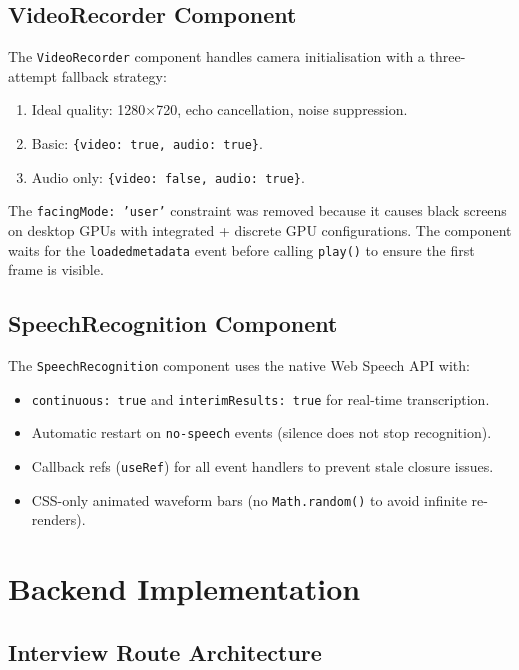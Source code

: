 \subsection{VideoRecorder Component}

The \texttt{VideoRecorder} component handles camera initialisation with a three-attempt fallback strategy:
\begin{enumerate}
    \item Ideal quality: 1280×720, echo cancellation, noise suppression.
    \item Basic: \texttt{\{video: true, audio: true\}}.
    \item Audio only: \texttt{\{video: false, audio: true\}}.
\end{enumerate}

The \texttt{facingMode: 'user'} constraint was removed because it causes black screens on desktop GPUs with integrated + discrete GPU configurations. The component waits for the \texttt{loadedmetadata} event before calling \texttt{play()} to ensure the first frame is visible.

\subsection{SpeechRecognition Component}

The \texttt{SpeechRecognition} component uses the native Web Speech API with:
\begin{itemize}
    \item \texttt{continuous: true} and \texttt{interimResults: true} for real-time transcription.
    \item Automatic restart on \texttt{no-speech} events (silence does not stop recognition).
    \item Callback refs (\texttt{useRef}) for all event handlers to prevent stale closure issues.
    \item CSS-only animated waveform bars (no \texttt{Math.random()} to avoid infinite re-renders).
\end{itemize}

\section{Backend Implementation}

\subsection{Interview Route Architecture}

